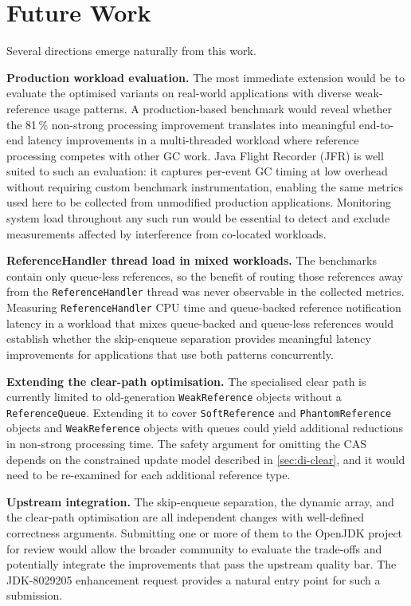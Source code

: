 \section{Future Work}
\label{sec:conc-future}

Several directions emerge naturally from this work.

\textbf{Production workload evaluation.} The most immediate extension would be to evaluate the optimised variants on real-world applications with diverse weak-reference usage patterns. A production-based benchmark would reveal whether the 81\,\% non-strong processing improvement translates into meaningful end-to-end latency improvements in a multi-threaded workload where reference processing competes with other \ac{GC} work. Java Flight Recorder (\acs{JFR}) is well suited to such an evaluation: it captures per-event \ac{GC} timing at low overhead without requiring custom benchmark instrumentation, enabling the same metrics used here to be collected from unmodified production applications. Monitoring system load throughout any such run would be essential to detect and exclude measurements affected by interference from co-located workloads.

\textbf{ReferenceHandler thread load in mixed workloads.} The benchmarks contain only queue-less references, so the benefit of routing those references away from the \texttt{ReferenceHandler} thread was never observable in the collected metrics. Measuring \texttt{ReferenceHandler} \ac{CPU} time and queue-backed reference notification latency in a workload that mixes queue-backed and queue-less references would establish whether the skip-enqueue separation provides meaningful latency improvements for applications that use both patterns concurrently.

\textbf{Extending the clear-path optimisation.} The specialised clear path is currently limited to old-generation \texttt{WeakReference} objects without a \texttt{ReferenceQueue}. Extending it to cover \texttt{SoftReference} and \texttt{PhantomReference} objects and \texttt{WeakReference} objects with queues could yield additional reductions in non-strong processing time. The safety argument for omitting the \ac{CAS} depends on the constrained update model described in \cref{sec:di-clear}, and it would need to be re-examined for each additional reference type.

\textbf{Upstream integration.} The skip-enqueue separation, the dynamic array, and the clear-path optimisation are all independent changes with well-defined correctness arguments. Submitting one or more of them to the OpenJDK project for review would allow the broader community to evaluate the trade-offs and potentially integrate the improvements that pass the upstream quality bar. The JDK-8029205 enhancement request provides a natural entry point for such a submission.

